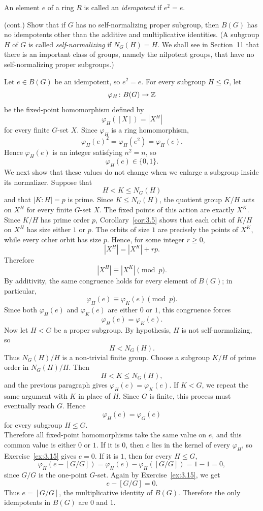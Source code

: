 \documentclass[../Odyssey_Project.tex]{subfiles}
\begin{document}
An element $e$ of a ring $R$ is called an \emph{idempotent} if $e^2 = e$.

\begin{exercise}
\label{ex:3.16}
(cont.) Show that if $G$ has no self-normalizing proper subgroup, then $B(G)$ has no idempotents other than the additive and multiplicative identities. (A subgroup $H$ of $G$ is called \emph{self-normalizing} if $N_G(H) = H$. We shall see in Section~11 that there is an important class of groups, namely the nilpotent groups, that have no self-normalizing proper subgroups.)
\end{exercise}
\begin{solution}
    Let $e\in B(G)$ be an idempotent, so $e^2=e$. For every subgroup $H\leq G$, let
    \[
        \varphi_H\colon B(G)\to \mathbb{Z}
    \]
    be the fixed-point homomorphism defined by
    \[
        \varphi_H([X])=|X^H|
    \]
    for every finite $G$-set $X$. Since $\varphi_H$ is a ring homomorphism,
    \[
        \varphi_H(e)^2=\varphi_H(e^2)=\varphi_H(e).
    \]
    Hence $\varphi_H(e)$ is an integer satisfying $n^2=n$, so
    \[
        \varphi_H(e)\in\{0,1\}.
    \]
    We next show that these values do not change when we enlarge a subgroup inside its normalizer. Suppose that
    \[
        H<K\leq N_G(H)
    \]
    and that $|K:H|=p$ is prime. Since $K\leq N_G(H)$, the quotient group $K/H$ acts on $X^H$ for every finite $G$-set $X$. The fixed points of this action are exactly $X^K$. Since $K/H$ has prime order $p$, Corollary~\ref{cor:3.5} shows that each orbit of $K/H$ on $X^H$ has size either $1$ or $p$. The orbits of size $1$ are precisely the points of $X^K$, while every other orbit has size $p$. Hence, for some integer $r\geq 0$,
    \[
        |X^H|=|X^K|+rp.
    \]
    Therefore
    \[
        |X^H|\equiv |X^K|\pmod p.
    \]
    By additivity, the same congruence holds for every element of $B(G)$; in particular,
    \[
        \varphi_H(e)\equiv \varphi_K(e)\pmod p.
    \]
    Since both $\varphi_H(e)$ and $\varphi_K(e)$ are either $0$ or $1$, this congruence forces
    \[
        \varphi_H(e)=\varphi_K(e).
    \]
    Now let $H<G$ be a proper subgroup. By hypothesis, $H$ is not self-normalizing, so
    \[
        H<N_G(H).
    \]
    Thus $N_G(H)/H$ is a non-trivial finite group. Choose a subgroup $K/H$ of prime order in $N_G(H)/H$. Then
    \[
        H<K\leq N_G(H),
    \]
    and the previous paragraph gives $\varphi_H(e)=\varphi_K(e)$. If $K<G$, we repeat the same argument with $K$ in place of $H$. Since $G$ is finite, this process must eventually reach $G$. Hence
    \[
        \varphi_H(e)=\varphi_G(e)
    \]
    for every subgroup $H\leq G$.\\
    Therefore all fixed-point homomorphisms take the same value on $e$, and this common value is either $0$ or $1$. If it is $0$, then $e$ lies in the kernel of every $\varphi_H$, so Exercise~\ref{ex:3.15} gives $e=0$. If it is $1$, then for every $H\leq G$,
    \[
        \varphi_H(e-[G/G])=\varphi_H(e)-\varphi_H([G/G])=1-1=0,
    \]
    since $G/G$ is the one-point $G$-set. Again by Exercise~\ref{ex:3.15}, we get
    \[
        e-[G/G]=0.
    \]
    Thus $e=[G/G]$, the multiplicative identity of $B(G)$. Therefore the only idempotents in $B(G)$ are $0$ and $1$.
\end{solution}
\end{document}
